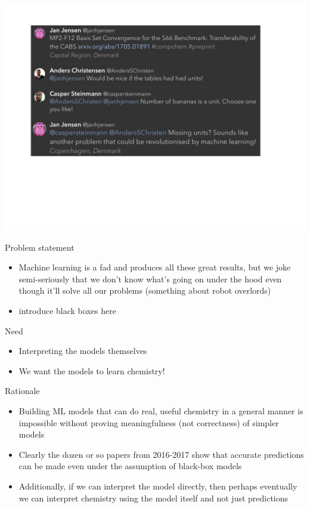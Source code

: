 \documentclass[xetex,compress]{beamer}
\begin{document}
\begin{frame}{}
  \begin{center}
    \includegraphics[width=1.10\textwidth]{./twitter.jpeg}
  \end{center}
\end{frame}

\begin{frame}{Problem statement}
  \begin{itemize}
  \item Machine learning is a fad and produces all these great results, but we joke semi-seriously that we don't know what's going on under the hood even though it'll solve all our problems (something about robot overlords)
  \item introduce black boxes here
  \end{itemize}
\end{frame}

\begin{frame}{Need}
  \begin{itemize}
  \item Interpreting the models themselves
  \item We want the models to learn chemistry!
  \end{itemize}
\end{frame}

\begin{frame}{Rationale}
  \begin{itemize}
  \item Building ML models that can do real, useful chemistry in a general manner is impossible without proving meaningfulness (not correctness) of simpler models
  \item Clearly the dozen or so papers from 2016-2017 show that accurate predictions can be made even under the assumption of black-box models
  \item Additionally, if we can interpret the model directly, then perhaps eventually we can interpret chemistry using the model itself and not just predictions
  \end{itemize}
\end{frame}
\end{document}
